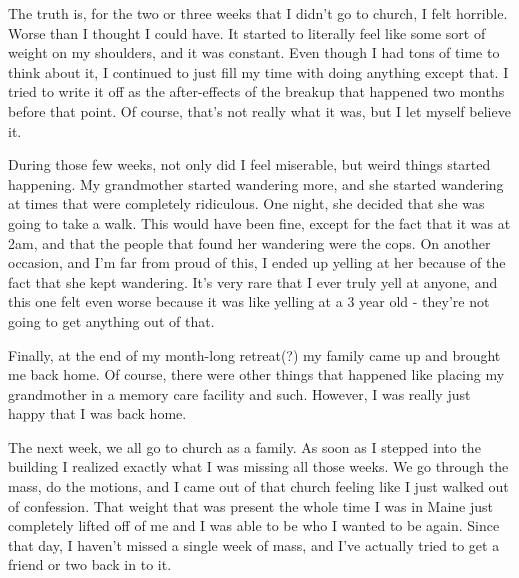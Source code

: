 \documentclass[12pt]{article}
\begin{document}
    The truth is, for the two or three weeks that I didn't go to church, I felt horrible. Worse than I thought I could 
    have. It started to literally feel like some sort of weight on my shoulders, and it was constant. Even though I
    had tons of time to think about it, I continued to just fill my time with doing anything except that. I tried to
    write it off as the after-effects of the breakup that happened two months before that point. Of course, that's
    not really what it was, but I let myself believe it.
    
    During those few weeks, not only did I feel miserable, but weird things started happening. My grandmother started
    wandering more, and she started wandering at times that were completely ridiculous. One night, she decided that
    she was going to take a walk. This would have been fine, except for the fact that it was at 2am, and that the
    people that found her wandering were the cops. On another occasion, and I'm far from proud of this, I ended up
    yelling at her because of the fact that she kept wandering. It's very rare that I ever truly yell at anyone,
    and this one felt even worse because it was like yelling at a 3 year old - they're not going to get anything out
    of that.

    Finally, at the end of my month-long retreat(?) my family came up and brought me back home. Of course, there were
    other things that happened like placing my grandmother in a memory care facility and such. However, I was really 
    just happy that I was back home.

    The next week, we all go to church as a family. As soon as I stepped into the building I realized exactly what I
    was missing all those weeks. We go through the mass, do the motions, and I came out of that church feeling like
    I just walked out of confession. That weight that was present the whole time I was in Maine just completely lifted
    off of me and I was able to be who I wanted to be again. Since that day, I haven't missed a single week of mass, 
    and I've actually tried to get a friend or two back in to it.
\end{document}
